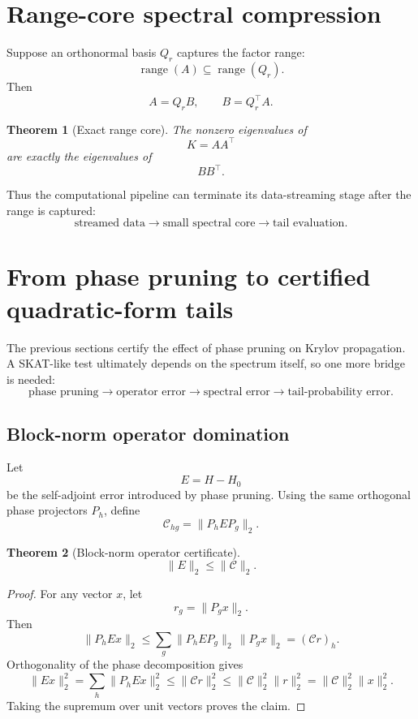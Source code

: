 \documentclass[11pt]{article}
\newtheorem{theorem}{Theorem}[section]
\theoremstyle{definition}
\theoremstyle{remark}
\begin{document}
\section{Range-core spectral compression}\label{sec:final-21}

Suppose an orthonormal basis \(Q_r\) captures the factor range:
\[
\operatorname{range}(A)\subseteq\operatorname{range}(Q_r).
\]
Then
\[
A=Q_rB,
\qquad
B=Q_r^\top A.
\]

\begin{theorem}[Exact range core]\label{claim:final-21-1}
The nonzero eigenvalues of
\[
K=AA^\top
\]
are exactly the eigenvalues of
\[
BB^\top.
\]
\end{theorem}

Thus the computational pipeline can terminate its data-streaming stage after
the range is captured:
\[
\boxed{
\text{streamed data}
\to
\text{small spectral core}
\to
\text{tail evaluation}.
}
\]

\section{From phase pruning to certified quadratic-form tails}\label{sec:final-22}

The previous sections certify the effect of phase pruning on Krylov
propagation.  A SKAT-like test ultimately depends on the spectrum itself, so
one more bridge is needed:
\[
\text{phase pruning}
\longrightarrow
\text{operator error}
\longrightarrow
\text{spectral error}
\longrightarrow
\text{tail-probability error}.
\]

\subsection{Block-norm operator domination}

Let
\[
E=H-H_0
\]
be the self-adjoint error introduced by phase pruning.  Using the same
orthogonal phase projectors \(P_h\), define
\[
\mathcal C_{hg}
=
\|P_hEP_g\|_2.
\]

\begin{theorem}[Block-norm operator certificate]\label{claim:final-22-1}
\[
\boxed{
\|E\|_2
\le
\|\mathcal C\|_2.
}
\]
\end{theorem}

\begin{proof}
For any vector \(x\), let
\[
r_g=\|P_gx\|_2.
\]
Then
\[
\|P_hEx\|_2
\le
\sum_g
\|P_hEP_g\|_2\,\|P_gx\|_2
=
(\mathcal C r)_h.
\]
Orthogonality of the phase decomposition gives
\[
\|Ex\|_2^2
=
\sum_h\|P_hEx\|_2^2
\le
\|\mathcal C r\|_2^2
\le
\|\mathcal C\|_2^2\|r\|_2^2
=
\|\mathcal C\|_2^2\|x\|_2^2.
\]
Taking the supremum over unit vectors proves the claim.
\end{proof}
\end{document}
